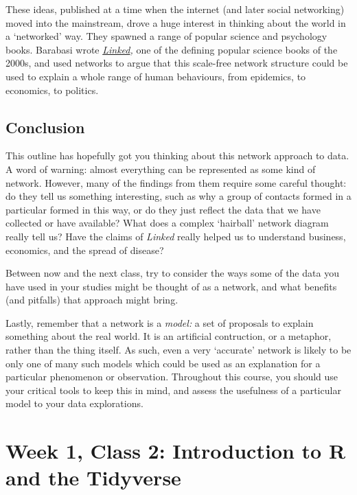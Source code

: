 \documentclass[
]{book}
\begin{document}
These ideas, published at a time when the internet (and later social networking) moved into the mainstream, drove a huge interest in thinking about the world in a `networked' way. They spawned a range of popular science and psychology books. Barabasi wrote \href{https://en.wikipedia.org/wiki/Linked:_The_New_Science_of_Networks}{\emph{Linked}}\emph{,} one of the defining popular science books of the 2000s, and used networks to argue that this scale-free network structure could be used to explain a whole range of human behaviours, from epidemics, to economics, to politics.

\hypertarget{conclusion}{%
\section{Conclusion}\label{conclusion}}

This outline has hopefully got you thinking about this network approach to data. A word of warning: almost everything can be represented as some kind of network. However, many of the findings from them require some careful thought: do they tell us something interesting, such as why a group of contacts formed in a particular formed in this way, or do they just reflect the data that we have collected or have available? What does a complex `hairball' network diagram really tell us? Have the claims of \emph{Linked} really helped us to understand business, economics, and the spread of disease?

Between now and the next class, try to consider the ways some of the data you have used in your studies might be thought of as a network, and what benefits (and pitfalls) that approach might bring.

Lastly, remember that a network is a \emph{model:} a set of proposals to explain something about the real world. It is an artificial contruction, or a metaphor, rather than the thing itself. As such, even a very `accurate' network is likely to be only one of many such models which could be used as an explanation for a particular phenomenon or observation. Throughout this course, you should use your critical tools to keep this in mind, and assess the usefulness of a particular model to your data explorations.

\hypertarget{week-1-class-2-introduction-to-r-and-the-tidyverse}{%
\chapter{Week 1, Class 2: Introduction to R and the Tidyverse}\label{week-1-class-2-introduction-to-r-and-the-tidyverse}}
\end{document}
